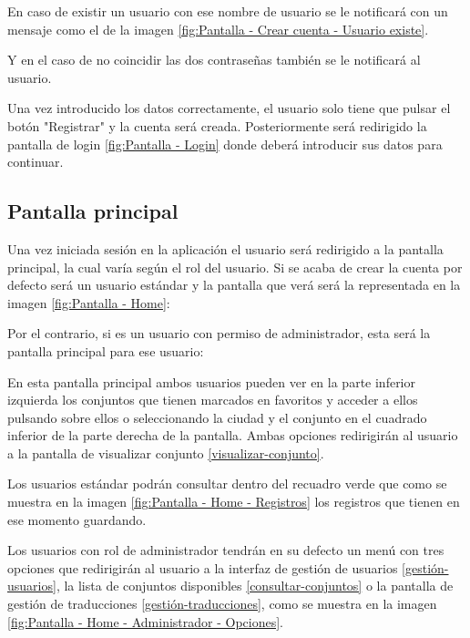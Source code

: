 En caso de existir un usuario con ese nombre de usuario se le notificará con un mensaje como el de la imagen \ref{fig:Pantalla - Crear cuenta - Usuario existe}.

Y en el caso de no coincidir las dos contraseñas también se le notificará al usuario.

Una vez introducido los datos correctamente, el usuario solo tiene que pulsar el botón "Registrar" y la cuenta será creada. Posteriormente será redirigido la pantalla de login \ref{fig:Pantalla - Login} donde deberá introducir sus datos para continuar.


\subsection{Pantalla principal}\label{home}
Una vez iniciada sesión en la aplicación el usuario será redirigido a la pantalla principal, la cual varía según el rol del usuario. Si se acaba de crear la cuenta por defecto será un usuario estándar y la pantalla que verá será la representada en la imagen \ref{fig:Pantalla - Home}:

Por el contrario, si es un usuario con permiso de administrador, esta será la pantalla principal para ese usuario:

En esta pantalla principal ambos usuarios pueden ver en la parte inferior izquierda los conjuntos que tienen marcados en favoritos y acceder a ellos pulsando sobre ellos o seleccionando la ciudad y el conjunto en el cuadrado inferior de la parte derecha de la pantalla. Ambas opciones redirigirán al usuario a la pantalla de visualizar conjunto \ref{visualizar-conjunto}.

Los usuarios estándar podrán consultar dentro del recuadro verde que como se muestra en la imagen \ref{fig:Pantalla - Home - Registros} los registros que tienen en ese momento guardando.

Los usuarios con rol de administrador tendrán en su defecto un menú con tres opciones que redirigirán al usuario a la interfaz de gestión de usuarios \ref{gestión-usuarios}, la lista de conjuntos disponibles \ref{consultar-conjuntos} o la pantalla de gestión de traducciones \ref{gestión-traducciones}, como se muestra en la imagen \ref{fig:Pantalla - Home - Administrador - Opciones}.

